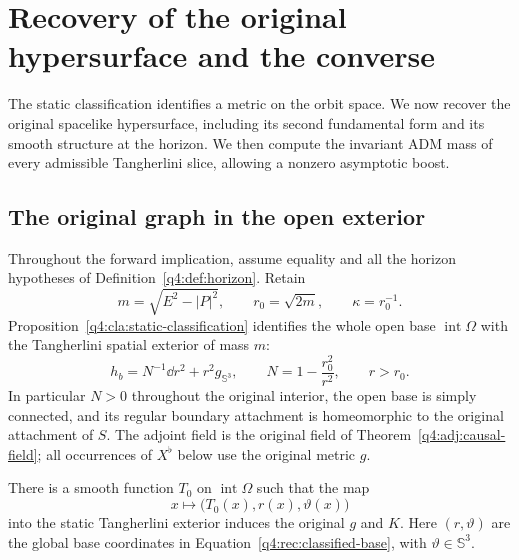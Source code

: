 \section{Recovery of the original hypersurface and the converse}
\label{q4:rec:section}

The static classification identifies a metric on the orbit space.  We now
recover the original spacelike hypersurface, including its second fundamental
form and its smooth structure at the horizon.  We then compute the invariant
ADM mass of every admissible Tangherlini slice, allowing a nonzero asymptotic
boost.

\subsection{The original graph in the open exterior}

Throughout the forward implication, assume equality and all the horizon
hypotheses of Definition~\ref{q4:def:horizon}.  Retain
\[
 m=\sqrt{E^2-|P|^2},\qquad r_0=\sqrt{2m},\qquad
 \kappa=r_0^{-1}.
\]
Proposition~\ref{q4:cla:static-classification} identifies the whole open base
$\operatorname{int}\Omega$ with the Tangherlini spatial exterior of mass $m$:
\begin{equation}
 h_b=N^{-1}\dd r^2+r^2g_{\mathbb S^3},\qquad
 N=1-\frac{r_0^2}{r^2},\qquad r>r_0.
 \label{q4:rec:classified-base}
\end{equation}
In particular $N>0$ throughout the original interior, the open base is simply
connected, and its regular boundary attachment is homeomorphic to the original
attachment of $S$.  The adjoint field is the original field of
Theorem~\ref{q4:adj:causal-field}; all occurrences of $X^\flat$ below use the
original metric $g$.

\begin{lemma}
\label{q4:rec:interior-graph}
There is a smooth function $T_0$ on $\operatorname{int}\Omega$ such that the
map
\[
 x\longmapsto\bigl(T_0(x),r(x),\vartheta(x)\bigr)
\]
into the static Tangherlini exterior induces the original $g$ and $K$.
Here $(r,\vartheta)$ are the global base coordinates in
Equation~\eqref{q4:rec:classified-base}, with $\vartheta\in\mathbb S^3$.
\end{lemma}

